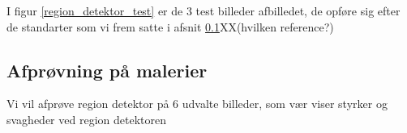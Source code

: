 I figur \ref{region_detektor_test} er de 3 test billeder afbilledet, de
opføre sig efter de standarter som vi frem satte i afsnit
\ref{}XX(hvilken reference?) 

\subsection{Afprøvning på malerier}
Vi vil afprøve region detektor på 6 udvalte billeder, som vær viser
styrker og svagheder ved region detektoren

\begin{figure}[!h]
    \centering
\end{figure}
